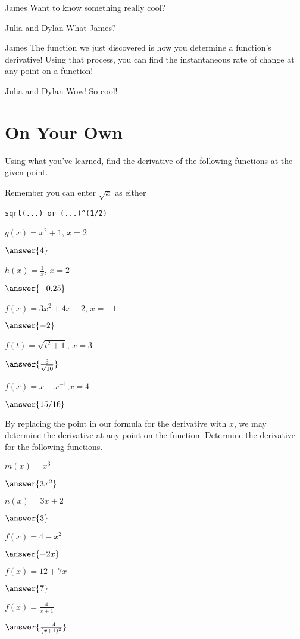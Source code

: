 \documentclass{ximera}
\begin{document}
\begin{dialogue}
\item[James] Want to know something really cool?
\item[Julia and Dylan] What James?
\item[James] The function we just discovered is how you determine a function's derivative! Using that process, you can find the instantaneous rate of change at any point on a function!
\item[Julia and Dylan] Wow! So cool!
\end{dialogue}

\section{On Your Own}
Using what you've learned, find the derivative of the following functions at the given point.
\setcounter{problem}{0}
\begin{question}
\begin{hint}
Remember you can enter $\sqrt{x}$ as either \begin{verbatim}sqrt(...) or (...)^(1/2)\end{verbatim}
\end{hint}
$g(x) = x^2+1$, $x=2$

$\answer{4}$

$h(x) = \frac{1}{x}$, $x=2$

$\answer{-0.25}$

$f(x)=3x^2+4x+2$, $x=-1$

$\answer{-2}$

$f(t)=\sqrt{t^2+1}$, $x=3$

$\answer{\frac{3}{\sqrt{10}}}$

$f(x) = x+x^{-1}$,$x=4$

$\answer{15/16}$

\end{question}

By replacing the point in our formula for the derivative with $x$, we may determine the derivative at any point on the function. Determine the derivative for the following functions.
\begin{question}
$m(x) = x^3$

$\answer{3x^2}$

$n(x) = 3x+2$

$\answer{3}$

$f(x)=4-x^2$

$\answer{-2x}$

$f(x) = 12+7x$

$\answer{7}$

$f(x)=\frac{4}{x+1}$

$\answer{\frac{-4}{(x+1)^2}}$

\end{question}
\end{document}
